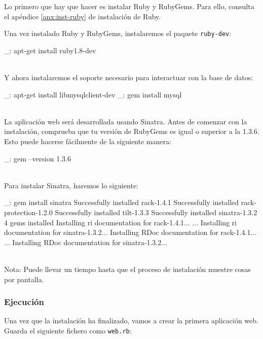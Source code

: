 Lo primero que hay que hacer es instalar Ruby y RubyGems. Para ello, consulta el apéndice \ref{anx:inst-ruby} de instalación de Ruby.

Una vez instalado Ruby y RubyGems, instalaremos el paquete \texttt{ruby-dev}:

\begin{bashcode}
_: apt-get install ruby1.8-dev
\end{bashcode}
\\

Y ahora instalaremos el soporte necesario para interactuar con la base de datos:

\begin{bashcode}
_: apt-get install libmysqlclient-dev
_: gem install mysql
\end{bashcode}
\\

La aplicación web será desarrollada usando Sinatra. Antes de comenzar con la instalación, comprueba que tu versión de RubyGems es igual o superior a la 1.3.6. Esto puede hacerse fácilmente de la siguiente manera:

\begin{bashcode}
_: gem --version
1.3.6
\end{bashcode}
\\

Para instalar Sinatra, haremos lo siguiente:

\begin{bashcode}
_: gem install sinatra
Successfully installed rack-1.4.1
Successfully installed rack-protection-1.2.0
Successfully installed tilt-1.3.3
Successfully installed sinatra-1.3.2
4 gems installed
Installing ri documentation for rack-1.4.1...
...
Installing ri documentation for sinatra-1.3.2...
Installing RDoc documentation for rack-1.4.1...
...
Installing RDoc documentation for sinatra-1.3.2...
\end{bashcode}
\\

Nota: Puede llevar un tiempo hasta que el proceso de instalación muestre cosas por pantalla.


\subsubsection{Ejecución}

Una vez que la instalación ha finalizado, vamos a crear la primera aplicación web. Guarda el siguiente fichero como \texttt{web.rb}:

